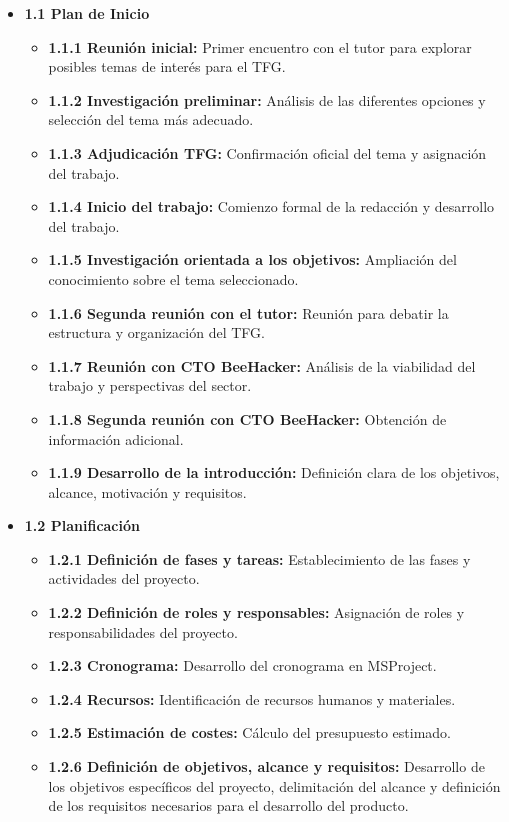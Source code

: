 \documentclass[a4paper, 10pt]{article}
\begin{document}
\begin{itemize}
    \item \textbf{1.1 Plan de Inicio}
    \begin{itemize}
        \item \textbf{1.1.1 Reunión inicial:} Primer encuentro con el tutor para explorar posibles temas de interés para el TFG.
        \item \textbf{1.1.2 Investigación preliminar:} Análisis de las diferentes opciones y selección del tema más adecuado.
        \item \textbf{1.1.3 Adjudicación TFG:} Confirmación oficial del tema y asignación del trabajo.
        \item \textbf{1.1.4 Inicio del trabajo:} Comienzo formal de la redacción y desarrollo del trabajo.
        \item \textbf{1.1.5 Investigación orientada a los objetivos:} Ampliación del conocimiento sobre el tema seleccionado.
        \item \textbf{1.1.6 Segunda reunión con el tutor:} Reunión para debatir la estructura y organización del TFG.
        \item \textbf{1.1.7 Reunión con CTO BeeHacker:} Análisis de la viabilidad del trabajo y perspectivas del sector.
        \item \textbf{1.1.8 Segunda reunión con CTO BeeHacker:} Obtención de información adicional.
        \item \textbf{1.1.9 Desarrollo de la introducción:} Definición clara de los objetivos, alcance, motivación y requisitos.
    \end{itemize}

    \item \textbf{1.2 Planificación}
    \begin{itemize}
        \item \textbf{1.2.1 Definición de fases y tareas:} Establecimiento de las fases y actividades del proyecto.
        \item \textbf{1.2.2 Definición de roles y responsables:} Asignación de roles y responsabilidades del proyecto.
        \item \textbf{1.2.3 Cronograma:} Desarrollo del cronograma en MSProject.
        \item \textbf{1.2.4 Recursos:} Identificación de recursos humanos y materiales.
        \item \textbf{1.2.5 Estimación de costes:} Cálculo del presupuesto estimado.
        \item \textbf{1.2.6 Definición de objetivos, alcance y requisitos:} Desarrollo de los objetivos específicos del proyecto, delimitación del alcance y definición de los requisitos necesarios para el desarrollo del producto.


\end{itemize}
\end{itemize}
\end{document}
